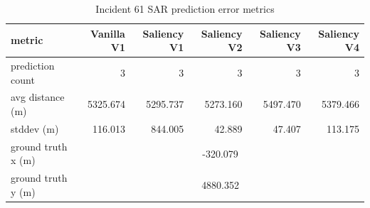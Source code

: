 \begin{table}[ht]
\centering
\caption{Incident 61 SAR prediction error metrics}
\label{tab:sar-incident-61}
\begin{tabular}{lrrrrr}
\hline
metric & Vanilla V1 & Saliency V1 & Saliency V2 & Saliency V3 & Saliency V4 \\
\hline
prediction count & 3 & 3 & 3 & 3 & 3 \\
avg distance (m) & 5325.674 & 5295.737 & 5273.160 & 5497.470 & 5379.466 \\
stddev (m) & 116.013 & 844.005 & 42.889 & 47.407 & 113.175 \\
ground truth x (m) & \multicolumn{5}{c}{-320.079} \\
ground truth y (m) & \multicolumn{5}{c}{4880.352} \\
\hline
\end{tabular}
\end{table}
